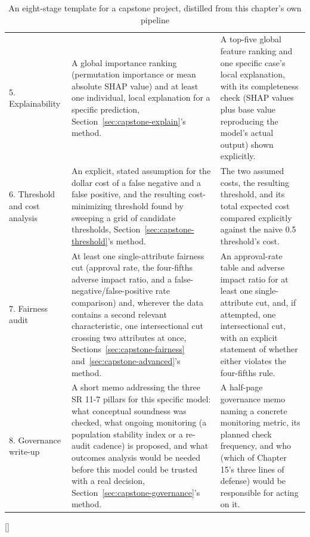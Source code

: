 \documentclass[../ai_in_finance]{subfiles}
\begin{document}
\begin{table}[htbp]
\begin{lrbox}{\bookmeasuredbox}
\begin{tabular}{p{2.1cm}p{6.3cm}p{5.6cm}}
5. Explainability & A global importance ranking (permutation importance or mean absolute SHAP value) and at least one individual, local explanation for a specific prediction, Section~\ref{sec:capstone-explain}'s method. & A top-five global feature ranking and one specific case's local explanation, with its completeness check (SHAP values plus base value reproducing the model's actual output) shown explicitly. \\
6. Threshold and cost analysis & An explicit, stated assumption for the dollar cost of a false negative and a false positive, and the resulting cost-minimizing threshold found by sweeping a grid of candidate thresholds, Section~\ref{sec:capstone-threshold}'s method. & The two assumed costs, the resulting threshold, and its total expected cost compared explicitly against the naive 0.5 threshold's cost. \\
7. Fairness audit & At least one single-attribute fairness cut (approval rate, the four-fifths adverse impact ratio, and a false-negative/false-positive rate comparison) and, wherever the data contains a second relevant characteristic, one intersectional cut crossing two attributes at once, Sections~\ref{sec:capstone-fairness} and~\ref{sec:capstone-advanced}'s method. & An approval-rate table and adverse impact ratio for at least one single-attribute cut, and, if attempted, one intersectional cut, with an explicit statement of whether either violates the four-fifths rule. \\
8. Governance write-up & A short memo addressing the three SR 11-7 pillars for this specific model: what conceptual soundness was checked, what ongoing monitoring (a population stability index or a re-audit cadence) is proposed, and what outcomes analysis would be needed before this model could be trusted with a real decision, Section~\ref{sec:capstone-governance}'s method. & A half-page governance memo naming a concrete monitoring metric, its planned check frequency, and who (which of Chapter 15's three lines of defense\index{three lines of defense}) would be responsible for acting on it. \\
\bottomrule
\end{tabular}
\end{lrbox}
\ifdim\wd\bookmeasuredbox<0.65\linewidth
\setlength{\bookcapwidth}{0.65\linewidth}
\else
\setlength{\bookcapwidth}{\wd\bookmeasuredbox}
\fi
{}[\bookcapwidth]{
\usebox{\bookmeasuredbox}
}{
\caption{An eight-stage template for a capstone project, distilled from this chapter's own pipeline}
\label{tab:capstone_template}
}
\end{table}
\end{document}
